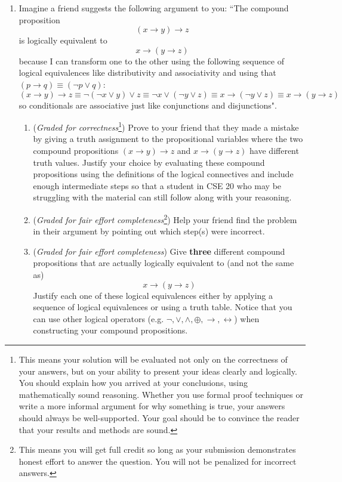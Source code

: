 \documentclass[12pt, oneside]{article}
\begin{document}
\begin{enumerate}

   \item Imagine a friend suggests the following argument to you: ``The compound proposition
   \[
   (x \to y) \to z
   \]
   is logically equivalent to 
   \[
   x \to (y \to z)
   \]
   because I can transform one to the other using the following sequence of logical equivalences
   like distributivity and associativity and using that $(p \to q) \equiv (\lnot p \lor q)$: 
   \[
      (x \to y) \to z \equiv
      \lnot (\lnot x \lor y) \lor z \equiv
      \lnot x \lor (\lnot y \lor z) \equiv
      x \to (\lnot y \lor z) \equiv x \to (y \to z)
   \]
   so conditionals
   are associative just like conjunctions and disjunctions".
   
   \begin{enumerate}
   \item ({\it Graded for correctness}\footnote{This means your solution will be
   evaluated not only on the correctness of your answers, but on your ability to 
   present your ideas clearly and logically. You should explain how you arrived at your conclusions, using 
   mathematically sound reasoning. Whether you use formal proof techniques or write a more informal argument for why 
   something is true, your answers should always be well-supported. Your goal should be to convince the reader that 
   your results and methods are sound.}) Prove to your friend that they made a mistake by giving a truth
   assignment to the propositional variables where 
   the two compound propositions 
   $ (x \to y) \to z$ and $ x \to (y \to z)$ have different truth values.
   Justify your choice by evaluating these compound propositions using the definitions of the logical connectives 
   and include enough intermediate steps so that a student in CSE 20 who may be 
   struggling with the material can still follow along with your reasoning.
   
   \item ({\it Graded for fair effort completeness}\footnote{This means you will get full credit so long as your submission 
   demonstrates honest effort to answer the question. You will not be penalized for incorrect answers.}) 
   Help your friend find the problem in their argument by pointing out which step(s) were incorrect.
   
   \item ({\it Graded for fair effort completeness}) Give {\bf three} different compound propositions
   that are actually logically equivalent to (and not the same as)
   \[
   x \to (y \to z)
   \]
   Justify each one of these logical equivalences either by applying a sequence of logical equivalences
   or using a truth table.  Notice that you can use other logical operators (e.g. $\lnot, \lor, \land, \oplus, \to, 
   \leftrightarrow$) 
   when constructing your compound propositions.


\end{enumerate}
\end{enumerate}
\end{document}
